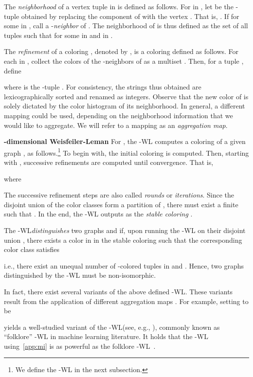 \documentclass{article}
\newcommand{\xhdr}[1]{{\noindent\bfseries #1}}
\theoremstyle{definition}
\newcommand{\new}[1]{\emph{#1}}
\newcommand{\kwl}{-\textsf{WL}\xspace}
\begin{document}
The \new{neighborhood} of a vertex tuple  in  is defined as follows. For  in , let  be the -tuple obtained by replacing the 
 component of  with the vertex . That is, . If  for some  in , call  a -\new{neighbor} of . The neighborhood of  is thus defined as the set of all tuples  such that  for some  in  and  in . 

The \emph{refinement} of a coloring , denoted by , is a coloring  defined as follows. 
For each  in , collect the colors of the -neighbors of  as a multiset .
Then, for a tuple , define

where  is the -tuple . For consistency, the strings  thus obtained are lexicographically sorted and renamed as integers. Observe that the new color  of  is solely dictated by the color histogram of its neighborhood. In general, a different mapping  could be used, depending on the neighborhood information that we would like to aggregate. We will refer to a mapping  as an \new{aggregation map}. 

\xhdr{-dimensional Weisfeiler-Leman}\label{wl_app} For , the \kwl computes a coloring  of a given graph , as follows.\footnote{We define the -\textsf{WL} in the next subsection.} To begin with, the initial coloring  is computed. Then, starting with , successive refinements  are computed until convergence. That is,

where 

The successive refinement steps are also called \new{rounds} or \new{iterations}. Since the disjoint union of the color classes form a partition of , there must exist a finite  such that . In the end, the \kwl outputs  as the \emph{stable coloring} . 

The \kwl \new{distinguishes} two graphs  and  if, upon running the \kwl on their disjoint union , there exists a color  in  in the stable coloring such that the corresponding color class  satisfies

i.e., there exist an unequal number of -colored tuples in  and . Hence, two graphs distinguished by the \kwl must be non-isomorphic. 

In fact, there exist several variants of the above defined \kwl. These variants result from the application of different aggregation maps . For example, setting  to be 

yields a well-studied variant of the \kwl (see, e.g., \cite{Cai+1992}), commonly known as ``folklore'' \kwl in machine learning literature. It holds that the -WL using~\cref{app:mi} is as powerful as the folklore -WL~\cite{GroheO15}.
\end{document}

